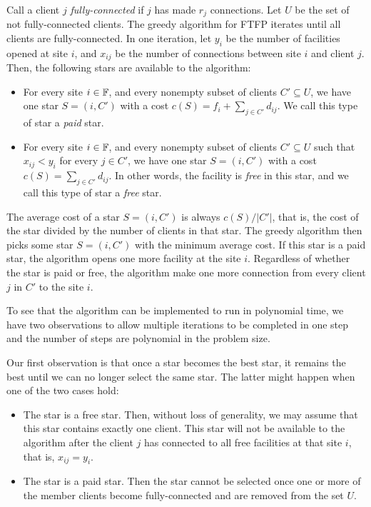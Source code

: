 \documentclass[oneside,final]{ucr}
\begin{document}
Call a client $j$ \emph{fully-connected} if $j$ has made
$r_j$ connections. Let $U$ be the set of not fully-connected
clients. The greedy algorithm for FTFP iterates until all
clients are fully-connected. In one iteration, let $y_i$ be
the number of facilities opened at site $i$, and $x_{ij}$ be
the number of connections between site $i$ and client
$j$. Then, the following stars are available to the
algorithm:
\begin{itemize}
\item For every site $i\in \mathbb{F}$, and every nonempty
  subset of clients $C' \subseteq U$, we have one star
  $S=(i,C')$ with a cost $c(S) = f_i + \sum_{j\in C'}
  d_{ij}$. We call this type of star a \emph{paid} star.
\item For every site $i\in \mathbb{F}$, and every nonempty
  subset of clients $C' \subseteq U$ such that $x_{ij} <
  y_i$ for every $j \in C'$, we have one star $S=(i,C')$
  with a cost $c(S) = \sum_{j\in C'} d_{ij}$. In other
  words, the facility is \emph{free} in this star, and we
  call this type of star a \emph{free} star.
\end{itemize}
The average cost of a star $S=(i,C')$ is always $c(S)/|C'|$,
that is, the cost of the star divided by the number of
clients in that star. The greedy algorithm then picks some
star $S=(i,C')$ with the minimum average cost. If this star
is a paid star, the algorithm opens one more facility at the
site $i$. Regardless of whether the star is paid or free,
the algorithm make one more connection from every client $j$
in $C'$ to the site $i$.

To see that the algorithm can be implemented to run in
polynomial time, we have two observations to allow multiple
iterations to be completed in one step and the number of
steps are polynomial in the problem size.

Our first observation is that once a star
becomes the best star, it remains the best until we can no
longer select the same star. The latter might happen when
one of the two cases hold:
\begin{itemize}
\item {} The star is a free star. Then, without loss
  of generality, we may assume that this star contains
  exactly one client. This star will not be available to the
  algorithm after the client $j$ has connected to all free
  facilities at that site $i$, that is, $x_{ij} = y_i$.
\item {} The star is a paid star. Then the star
  cannot be selected once one or more of the member clients
  become fully-connected and are removed from the set $U$.
\end{itemize}
\end{document}

